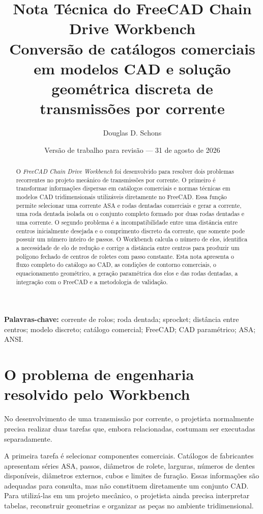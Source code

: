 \documentclass[11pt]{article}
\title{Nota Técnica do FreeCAD Chain Drive Workbench\\
Conversão de catálogos comerciais em modelos CAD e solução geométrica discreta de transmissões por corrente}
\author{Douglas D. Schons}
\date{Versão de trabalho para revisão --- 31 de agosto de 2026}
\begin{document}
\maketitle

\begin{abstract}
O \emph{FreeCAD Chain Drive Workbench} foi desenvolvido para resolver dois
problemas recorrentes no projeto mecânico de transmissões por corrente. O
primeiro é transformar informações dispersas em catálogos comerciais e normas
técnicas em modelos CAD tridimensionais utilizáveis diretamente no FreeCAD.
Essa função permite selecionar uma corrente ASA e rodas dentadas comerciais e
gerar a corrente, uma roda dentada isolada ou o conjunto completo formado por
duas rodas dentadas e uma corrente. O segundo problema é a incompatibilidade
entre uma distância entre centros inicialmente desejada e o comprimento
discreto da corrente, que somente pode possuir um número inteiro de passos. O
Workbench calcula o número de elos, identifica a necessidade de elo de redução
e corrige a distância entre centros para produzir um polígono fechado de
centros de roletes com passo constante. Esta nota apresenta o fluxo completo
do catálogo ao CAD, as condições de contorno comerciais, o equacionamento
geométrico, a geração paramétrica dos elos e das rodas dentadas, a integração
com o FreeCAD e a metodologia de validação.
\end{abstract}

\noindent\textbf{Palavras-chave:} corrente de rolos; roda dentada; sprocket;
distância entre centros; modelo discreto; catálogo comercial; FreeCAD; CAD
paramétrico; ASA; ANSI.

\tableofcontents

\section{O problema de engenharia resolvido pelo Workbench}

No desenvolvimento de uma transmissão por corrente, o projetista normalmente
precisa realizar duas tarefas que, embora relacionadas, costumam ser executadas
separadamente.

A primeira tarefa é selecionar componentes comerciais. Catálogos de
fabricantes apresentam séries ASA, passos, diâmetros de rolete, larguras,
números de dentes disponíveis, diâmetros externos, cubos e limites de furação.
Essas informações são adequadas para consulta, mas não constituem diretamente
um conjunto CAD. Para utilizá-las em um projeto mecânico, o projetista ainda
precisa interpretar tabelas, reconstruir geometrias e organizar as peças no
ambiente tridimensional.
\end{document}
